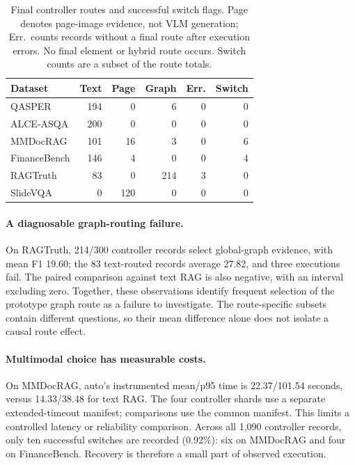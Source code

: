 \begin{table}[t]
\centering
\small
\begin{tabular}{@{}lrrrrr@{}}
\toprule
Dataset & Text & Page & Graph & Err. & Switch \\
\midrule
QASPER & 194 & 0 & 6 & 0 & 0 \\
ALCE-ASQA & 200 & 0 & 0 & 0 & 0 \\
MMDocRAG & 101 & 16 & 3 & 0 & 6 \\
FinanceBench & 146 & 4 & 0 & 0 & 4 \\
RAGTruth & 83 & 0 & 214 & 3 & 0 \\
SlideVQA & 0 & 120 & 0 & 0 & 0 \\
\bottomrule
\end{tabular}
\caption{Final controller routes and successful switch flags. Page denotes page-image evidence, not VLM generation; Err.\ counts records without a final route after execution errors. No final element or hybrid route occurs. Switch counts are a subset of the route totals.}
\label{tab:routes}
\end{table}

\paragraph{A diagnosable graph-routing failure.}
On RAGTruth, 214/300 controller records select global-graph evidence, with mean F1 19.60; the 83 text-routed records average 27.82, and three executions fail. The paired comparison against text RAG is also negative, with an interval excluding zero. Together, these observations identify frequent selection of the prototype graph route as a failure to investigate. The route-specific subsets contain different questions, so their mean difference alone does not isolate a causal route effect.

\paragraph{Multimodal choice has measurable costs.}
On MMDocRAG, auto's instrumented mean/p95 time is 22.37/101.54 seconds, versus 14.33/38.48 for text RAG. The four controller shards use a separate extended-timeout manifest; comparisons use the common manifest. This limits a controlled latency or reliability comparison. Across all 1,090 controller records, only ten successful switches are recorded (0.92\%): six on MMDocRAG and four on FinanceBench. Recovery is therefore a small part of observed execution.

